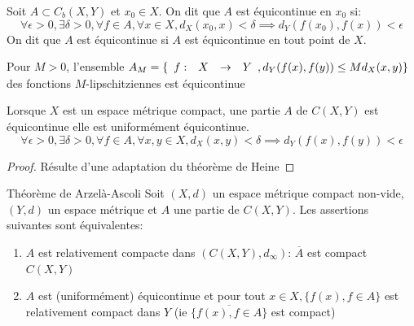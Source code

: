 \documentclass[]{report}
\begin{document}
    \begin{df}{}{}
        Soit $A\subset C_b(X,Y)$ et $x_0\in X$. On dit que $A$ est équicontinue en $x_0$ si:
        \[\forall \epsilon>0,\exists \delta>0,\forall f\in A,\forall x\in X, d_X(x_0,x)<\delta\implies d_Y(f(x_0),f(x))<\epsilon\]
        On dit que $A$ est équicontinue si $A$ est équicontinue en tout point de $X$.
    \end{df}
    
    \begin{ex}{}{}
        Pour $M>0$, l'ensemble $A_M=\{\begin{array}{ccccc} f : & X & \to & Y \end{array},d_Y(f(x),f(y))\le M d_X(x,y)\}$ des fonctions $M$-lipschitziennes est équicontinue
    \end{ex}

    \begin{prop}{}{}
        Lorsque $X$ est un espace métrique compact, une partie $A$ de $C(X,Y)$ est équicontinue \ssi elle est uniformément équicontinue.
        \[\forall \epsilon>0,\exists \delta>0,\forall f\in A,\forall x,y\in X, d_X(x,y)<\delta\implies d_Y(f(x),f(y))<\epsilon\]
    \end{prop}

    \begin{proof}
        Résulte d'une adaptation du théorème de Heine
    \end{proof}

    \begin{tm}{Théorème de Arzelà-Ascoli}{}
        Soit $(X,d)$ un espace métrique compact non-vide, $(Y,d)$ un espace métrique et $A$ une partie de $C(X,Y)$. Les assertions suivantes sont équivalentes:
        \begin{enumerate}
            \item $A$ est relativement compacte dans $(C(X,Y),d_\infty)$: $\overline{A}$ est compact $C(X,Y)$
            \item $A$ est (uniformément) équicontinue et pour tout $x\in X,\{ f(x),f\in A\}$ est relativement compact dans $Y$ (ie $\overline{\{f(x),f\in A\}}$ est compact)
        \end{enumerate}
    \end{tm}
\end{document}
